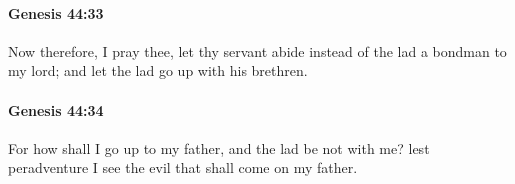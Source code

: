 		\paragraph{Genesis 44:33} %
			\label{GENESIS-44-33}

			Now therefore, I pray thee, let thy servant abide instead of the lad a bondman to my lord; and let the lad go up with his brethren.


		\paragraph{Genesis 44:34} %
			\label{GENESIS-44-34}

			For how shall I go up to my father, and the lad be not with me? lest peradventure I see the evil that shall come on my father.


